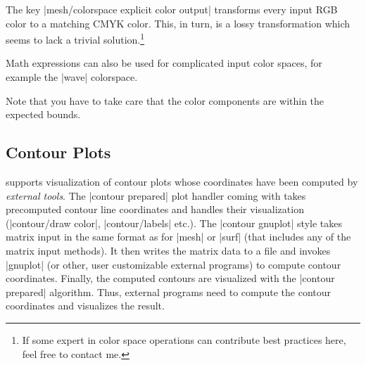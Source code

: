 {{\pgfplotsexpensiveexample
\begin{codeexample}[]
\end{codeexample}
%
\noindent The key |mesh/colorspace explicit color output| transforms every
input RGB color to a matching CMYK color. This, in turn, is a lossy
transformation which seems to lack a trivial solution.\footnote{If some expert
in color space operations can contribute best practices here, feel free to
contact me.}

Math expressions can also be used for complicated input color spaces, for
example the |wave| colorspace.
%
\begin{codeexample}[]
\end{codeexample}

Note that you have to take care that the color components are within the
expected bounds.
}%


\subsection{Contour Plots}
{
%
%
%
\PGFPlots{} supports visualization of contour plots whose coordinates have been
computed by \emph{external tools}. The |contour prepared| plot handler coming
with \PGFPlots{} takes precomputed contour line coordinates and handles their
visualization (|contour/draw color|, |contour/labels| etc.). The
|contour gnuplot| style takes matrix input in the same format as for |mesh| or
|surf| (that includes any of the \PGFPlots{} matrix input methods). It then
writes the matrix data to a file and invokes |gnuplot| (or other, user
customizable external programs) to compute contour coordinates. Finally, the
computed contours are visualized with the |contour prepared| algorithm. Thus,
external programs need to compute the contour coordinates and \PGFPlots{}
visualizes the result.

}}
